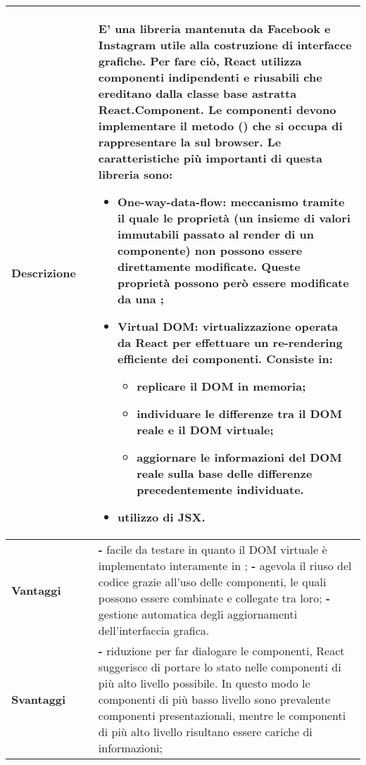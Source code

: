 \begin{table}[H]
	\centering
	\begin{tabular}{p{2cm}p{0.5cm}p{11.5cm}}
		\arrayrulecolor{lightgray}
		\toprule
		\textbf{Descrizione} & &
		E' una libreria \js{} \glo{Open source}{open source} mantenuta da Facebook e Instagram utile alla costruzione di interfacce grafiche. Per fare ciò, React utilizza componenti indipendenti e riusabili che ereditano dalla classe base astratta React.Component. Le componenti devono implementare il metodo \glo{Render}{render}() che si occupa di rappresentare la \glo{Componente}{componente} sul browser.
		Le caratteristiche più importanti di questa libreria sono:
		\begin{itemize}
			\item {\textbf{One-way-data-flow:}} meccanismo tramite il quale le proprietà (un insieme di valori immutabili passato al render di un componente) non possono essere direttamente modificate. Queste proprietà possono però essere modificate da una \glo{Callback}{callback};
			\item {\textbf{Virtual DOM:}} virtualizzazione operata da React per effettuare un re-rendering efficiente dei componenti. 
			Consiste in:
			\begin{itemize}
				\item replicare il DOM in memoria;
				\item individuare le differenze tra il DOM reale e il DOM virtuale;
				\item aggiornare le informazioni del DOM reale sulla base delle differenze precedentemente individuate.
			\end{itemize}
			\item utilizzo di JSX.
		\end{itemize}
		\\ \midrule \textbf{Vantaggi} & &
		\textbf{- }facile da testare in quanto il DOM virtuale è implementato interamente in \js;
		\newline
		\textbf{- }agevola il riuso del codice grazie all'uso delle componenti, le quali possono essere combinate e collegate tra loro;
		\newline
		\textbf{- } gestione automatica degli aggiornamenti dell'interfaccia grafica.
		\\ \midrule \textbf{Svantaggi} & &
		\textbf{- } riduzione per far dialogare le componenti, React suggerisce di portare lo stato nelle componenti di più alto livello possibile. In questo modo le componenti di più basso livello sono prevalente componenti presentazionali, mentre le componenti di più alto livello risultano essere cariche di informazioni;
		\newline
		\\ \bottomrule
	\end{tabular}
\end{table}

